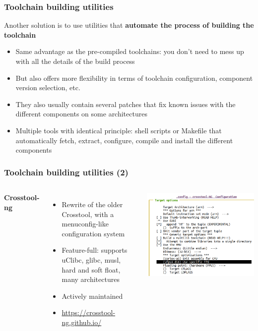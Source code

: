 \begin{frame}
  \frametitle{Toolchain building utilities}
  Another solution is to use utilities that {\bf automate the process of
  building the toolchain}
  \begin{itemize}
  \item Same advantage as the pre-compiled toolchains: you don't need
    to mess up with all the details of the build process
  \item But also offers more flexibility in terms of toolchain
    configuration, component version selection, etc.
  \item They also usually contain several patches that fix known
    issues with the different components on some architectures
  \item Multiple tools with identical principle: shell scripts or
    Makefile that automatically fetch, extract, configure, compile and
    install the different components
\end{itemize}
\end{frame}

\begin{frame}
  \frametitle{Toolchain building utilities (2)}
  \begin{columns}
    {\bf Crosstool-ng}
    \begin{itemize}
      \item Rewrite of the older Crosstool, with a menuconfig-like configuration
	system
      \item Feature-full: supports uClibc, glibc, musl, hard and soft
	float, many architectures
      \item Actively maintained
      \item \url{https://crosstool-ng.github.io/}
    \end{itemize}
    \includegraphics[width=\textwidth]{slides/sysdev-toolchains-obtaining/ct-ng-menu.png}
  \end{columns}
\end{frame}

